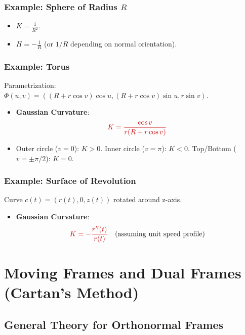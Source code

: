 \documentclass[a4paper,12pt]{article}
\newcommand{\formula}[1]{\textcolor{formulacolor}{#1}}
\begin{document}
\subsubsection{Example: Sphere of Radius $R$}
\begin{itemize}
    \item $K = \frac{1}{R^2}$.
    \item $H = -\frac{1}{R}$ (or $1/R$ depending on normal orientation).
\end{itemize}

\subsubsection{Example: Torus}
Parametrization: $\Phi(u, v) = ((R + r \cos v) \cos u, (R + r \cos v) \sin u, r \sin v)$.
\begin{itemize}
    \item \textbf{Gaussian Curvature}:
    \begin{equation}
        \formula{K = \frac{\cos v}{r(R + r \cos v)}}
    \end{equation}
    \item Outer circle ($v=0$): $K > 0$. Inner circle ($v=\pi$): $K < 0$. Top/Bottom ($v=\pm \pi/2$): $K=0$.
\end{itemize}

\subsubsection{Example: Surface of Revolution}
Curve $c(t) = (r(t), 0, z(t))$ rotated around z-axis.
\begin{itemize}
    \item \textbf{Gaussian Curvature}:
    \begin{equation}
        \formula{K = -\frac{r''(t)}{r(t)}} \quad \text{(assuming unit speed profile)}
    \end{equation}
\end{itemize}

\section{Moving Frames and Dual Frames (Cartan's Method)}

\subsection{General Theory for Orthonormal Frames}
\end{document}
